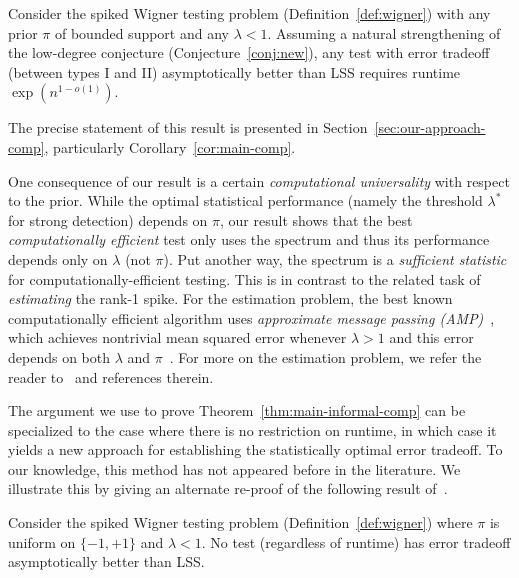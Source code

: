 \documentclass[11pt]{article}
\begin{document}
\begin{theorem}
\label{thm:main-informal-comp}
Consider the spiked Wigner testing problem (Definition~\ref{def:wigner}) with any prior $\pi$ of bounded support and any $\lambda < 1$. Assuming a natural strengthening of the low-degree conjecture (Conjecture~\ref{conj:new}), any test with error tradeoff (between types I and II) asymptotically better than LSS requires runtime $\exp(n^{1-o(1)})$.
\end{theorem}

\noindent The precise statement of this result is presented in Section~\ref{sec:our-approach-comp}, particularly Corollary~\ref{cor:main-comp}.

One consequence of our result is a certain \emph{computational universality} with respect to the prior. While the optimal statistical performance (namely the threshold $\lambda^*$ for strong detection) depends on $\pi$, our result shows that the best \emph{computationally efficient} test only uses the spectrum and thus its performance depends only on $\lambda$ (not $\pi$). Put another way, the spectrum is a \emph{sufficient statistic} for computationally-efficient testing. This is in contrast to the related task of \emph{estimating} the rank-1 spike. For the estimation problem, the best known computationally efficient algorithm uses \emph{approximate message passing (AMP)}~\cite{amp,BM-amp}, which achieves nontrivial mean squared error whenever $\lambda > 1$ and this error depends on both $\lambda$ and $\pi$~\cite{FR-amp,MV-amp}. For more on the estimation problem, we refer the reader to~\cite{miolane-survey} and references therein.

The argument we use to prove Theorem~\ref{thm:main-informal-comp} can be specialized to the case where there is no restriction on runtime, in which case it yields a new approach for establishing the statistically optimal error tradeoff. To our knowledge, this method has not appeared before in the literature. We illustrate this by giving an alternate re-proof of the following result of~\cite{fund-limits-wigner}.

\begin{theorem}
\label{thm:main-informal-stat}
Consider the spiked Wigner testing problem (Definition~\ref{def:wigner}) where $\pi$ is uniform on $\{-1,+1\}$ and $\lambda < 1$. No test (regardless of runtime) has error tradeoff asymptotically better than LSS.
\end{theorem}
\end{document}

